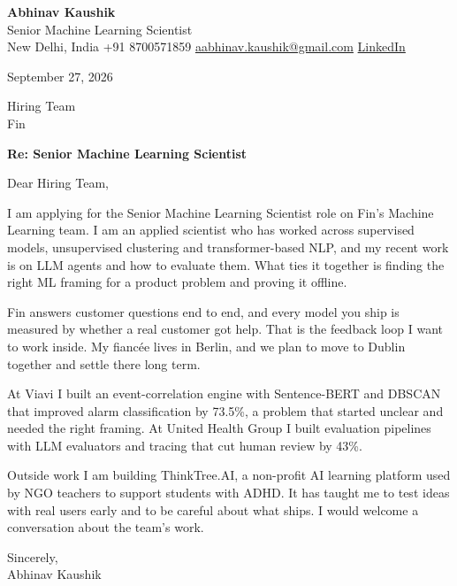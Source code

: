 \documentclass[11pt,a4paper]{article}
\begin{document}
{\Large\bfseries Abhinav Kaushik}\\
Senior Machine Learning Scientist\\
New Delhi, India \textbar{} +91 8700571859 \textbar{} \href{mailto:aabhinav.kaushik@gmail.com}{aabhinav.kaushik@gmail.com} \textbar{} \href{https://www.linkedin.com/in/abhinav-kaushik10/}{LinkedIn}  

September 27, 2026

Hiring Team\\
Fin

\textbf{Re: Senior Machine Learning Scientist}

Dear Hiring Team,

I am applying for the Senior Machine Learning Scientist role on Fin's Machine Learning team. I am an applied scientist who has worked across supervised models, unsupervised clustering and transformer-based NLP, and my recent work is on LLM agents and how to evaluate them. What ties it together is finding the right ML framing for a product problem and proving it offline.

Fin answers customer questions end to end, and every model you ship is measured by whether a real customer got help. That is the feedback loop I want to work inside. My fiancée lives in Berlin, and we plan to move to Dublin together and settle there long term.

At Viavi I built an event-correlation engine with Sentence-BERT and DBSCAN that improved alarm classification by 73.5\%, a problem that started unclear and needed the right framing. At United Health Group I built evaluation pipelines with LLM evaluators and tracing that cut human review by 43\%.

Outside work I am building ThinkTree.AI, a non-profit AI learning platform used by NGO teachers to support students with ADHD. It has taught me to test ideas with real users early and to be careful about what ships. I would welcome a conversation about the team's work.

Sincerely,\\[4pt]
Abhinav Kaushik
\end{document}
